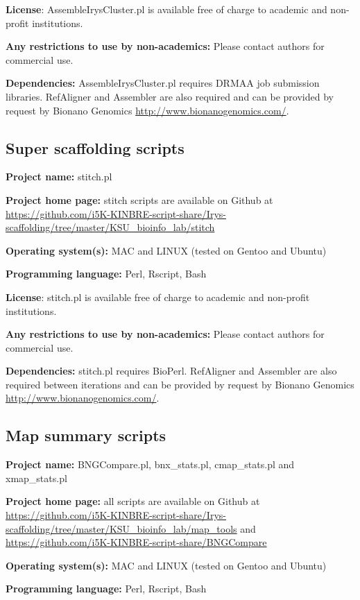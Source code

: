 \documentclass{bmcart}
\begin{document}
\textbf{License}: AssembleIrysCluster.pl is available free of charge to academic and non-profit institutions.

\textbf{Any restrictions to use by non-academics:} Please contact authors for commercial use.

\textbf{Dependencies:} AssembleIrysCluster.pl requires DRMAA job submission libraries. RefAligner and Assembler are also required and can be provided by request by Bionano Genomics \url{http://www.bionanogenomics.com/}.

\subsection*{\textbf{Super scaffolding scripts}}

\textbf{Project name:} stitch.pl

\textbf{Project home page:} stitch scripts are available on Github at \url{https://github.com/i5K-KINBRE-script-share/Irys-scaffolding/tree/master/KSU\_bioinfo\_lab/stitch}

\textbf{Operating system(s):} MAC and LINUX (tested on Gentoo and Ubuntu)

\textbf{Programming language:} Perl, Rscript, Bash

\textbf{License}: stitch.pl is available free of charge to academic and non-profit institutions.

\textbf{Any restrictions to use by non-academics:} Please contact authors for commercial use.

\textbf{Dependencies:} stitch.pl requires BioPerl. RefAligner and Assembler are also required between iterations and can be provided by request by Bionano Genomics \url{http://www.bionanogenomics.com/}.

\subsection*{\textbf{Map summary scripts}}

\textbf{Project name:} BNGCompare.pl, bnx\_stats.pl, cmap\_stats.pl and xmap\_stats.pl

\textbf{Project home page:} all scripts are available on Github at \url{https://github.com/i5K-KINBRE-script-share/Irys-scaffolding/tree/master/KSU\_bioinfo\_lab/map\_tools} and \url{https://github.com/i5K-KINBRE-script-share/BNGCompare}

\textbf{Operating system(s):} MAC and LINUX (tested on Gentoo and Ubuntu)

\textbf{Programming language:} Perl, Rscript, Bash
\end{document}
